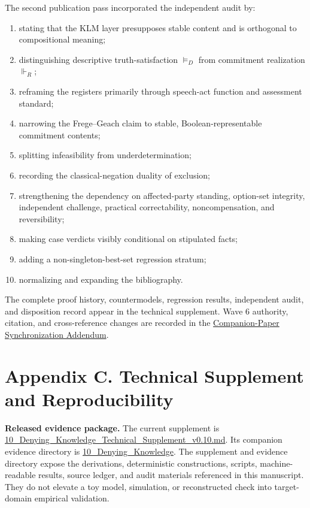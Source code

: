 \documentclass[
  11pt,
]{article}
\providecommand{\tightlist}{%
  \setlength{\itemsep}{0pt}\setlength{\parskip}{0pt}}
\begin{document}
The second publication pass incorporated the independent audit by:

\begin{enumerate}
\def\labelenumi{\arabic{enumi}.}
\tightlist
\item
  stating that the KLM layer presupposes stable content and is
  orthogonal to compositional meaning;
\item
  distinguishing descriptive truth-satisfaction \(\vDash_D\) from
  commitment realization \(\Vdash_R\);
\item
  reframing the registers primarily through speech-act function and
  assessment standard;
\item
  narrowing the Frege--Geach claim to stable, Boolean-representable
  commitment contents;
\item
  splitting infeasibility from underdetermination;
\item
  recording the classical-negation duality of exclusion;
\item
  strengthening the dependency on affected-party standing, option-set
  integrity, independent challenge, practical correctability,
  noncompensation, and reversibility;
\item
  making case verdicts visibly conditional on stipulated facts;
\item
  adding a non-singleton-best-set regression stratum;
\item
  normalizing and expanding the bibliography.
\end{enumerate}

The complete proof history, countermodels, regression results,
independent audit, and disposition record appear in the technical
supplement. Wave 6 authority, citation, and cross-reference changes are
recorded in the
\href{../supplements/Framework_Addendum_Companion_Synchronization_v0.10.md}{Companion-Paper
Synchronization Addendum}.

\section{Appendix C. Technical Supplement and
Reproducibility}\label{appendix-c.-technical-supplement-and-reproducibility}

\textbf{Released evidence package.} The current supplement is
\href{../supplements/10_Denying_Knowledge_Technical_Supplement_v0.10.md}{10\_Denying\_Knowledge\_Technical\_Supplement\_v0.10.md}.
Its companion evidence directory is
\href{../evidence/10_Denying_Knowledge/README.md}{10\_Denying\_Knowledge}.
The supplement and evidence directory expose the derivations,
deterministic constructions, scripts, machine-readable results, source
ledger, and audit materials referenced in this manuscript. They do not
elevate a toy model, simulation, or reconstructed check into
target-domain empirical validation.
\end{document}
